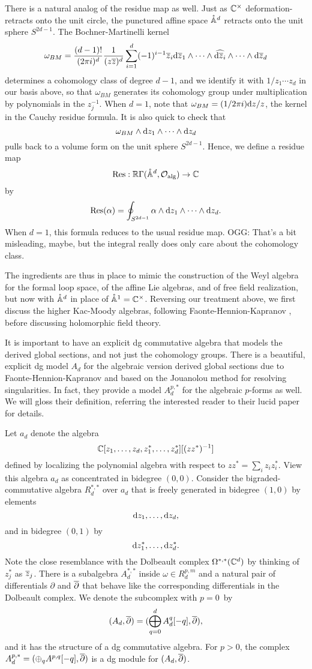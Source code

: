 \documentclass[11pt]{amsart}
\def\pAA{\mathring{\AA}}
\def\owen#1{{\textcolor{green!65!black}{OGG: {#1}}}}
\begin{document}
There is a natural analog of the residue map as well.
Just as $\mathbb C^\times$ deformation-retracts onto the unit circle,
the punctured affine space $\pAA^d$ retracts onto the unit sphere $S^{2d-1}$.
The Bochner-Martinelli kernel 
\[
\omega_{BM} = \frac{(d-1)!}{(2 \pi i)^d} \frac{1}{(z{\overline{z}})^d} \sum_{i=1}^d (-1)^{i-1} {\overline{z}}_i {\rm d} {\overline{z}}_1 \wedge \cdots \wedge \widehat{{\rm d} {\overline{z}}_i} \wedge \cdots \wedge {\rm d} {\overline{z}}_d
\]
determines a cohomology class of degree $d-1$, and we identify it with $1/z_1 \cdots z_d$ in our basis above,
so that $\omega_{BM}$ generates its cohomology group under multiplication by polynomials in the $z_j^{-1}$.
When $d = 1$, note that $\omega_{BM} = (1/2\pi i){\rm d} z/z$, the kernel in the Cauchy residue formula.
It is also quick to check that
\[
\omega_{BM} \wedge {\rm d} z_1 \wedge \cdots \wedge {\rm d} z_d
\]
pulls back to a volume form on the unit sphere $S^{2d-1}$.
Hence, we define a residue map
\[
\Res: \RR \Gamma(\pAA^d, \cO_{\rm alg})  \to \CC
\]
by
\[
{\rm Res}(\alpha) = \oint_{S^{2d-1}} \alpha \wedge {\rm d} z_1 \wedge \cdots \wedge {\rm d} z_d.
\]
When $d =1$, this formula reduces to the usual residue map.
\owen{That's a bit misleading, maybe, but the integral really does only care about the cohomology class.}

The ingredients are thus in place to mimic the construction of the Weyl algebra for the formal loop space, of the affine Lie algebras, and of free field realization, but now with $\pAA^d$ in place of $\pAA^1 = \CC^\times$.
Reversing our treatment above, we first discuss the higher Kac-Moody algebras, 
following Faonte-Hennion-Kapranov \cite{FHK},
before discussing holomorphic field theory.

It is important to have an explicit dg commutative algebra that models the derived global sections,
and not just the cohomology groups.
There is a beautiful, explicit dg model $A_d$ for the algebraic version derived global sections due to Faonte-Hennion-Kapranov \cite{FHK} and based on the Jouanolou method for resolving singularities. 
In fact, they provide a model $A^{p,*}_d$ for the algebraic $p$-forms as well.
We will gloss their definition, referring the interested reader to their lucid paper for details.

Let $a_d$ denote the algebra  
\[
\mathbb C[z_1,\ldots,z_d, z_1^*,\ldots,z_d^*][(z z^*)^{-1}]
\]
defined by localizing the polynomial algebra with respect to $zz^* = \sum_i z_i z^*_i$.
View this algebra $a_d$ as concentrated in bidegree $(0,0)$.
Consider the bigraded-commutative algebra $R^{*,*}_d$ over $a_d$ that is freely generated in bidegree $(1,0)$ by elements
\[
{\rm d} z_1,\ldots , {\rm d} z_d,
\] 
and in bidegree $(0,1)$ by
\[
{\rm d} z_1^*,\ldots, {\rm d} z_d^*.
\]
Note the close resemblance with the Dolbeault complex $\Omega^{*,*}(\mathbb C^d)$ by thinking of $z_j^*$ as ${\overline{z}}_j$.
There is a subalgebra $A^{*,*}_d$ inside $\omega \in R^{p,m}_d$ and a natural pair of differentials $\partial$ and ${\overline{\partial}}$ that behave like the corresponding differentials in the Dolbeault complex.
We denote the subcomplex with $p=0$~by 
\[
(A_d, {\overline{\partial}}) = (\bigoplus_{q = 0}^d A_d^{q}[-q], {\overline{\partial}}),
\] 
and it has the structure of a dg commutative algebra.
For $p>0$, the complex $A^{p,*}_d = (\oplus_q A^{p,q}[-q], {\overline{\partial}})$ is a dg module for $(A_d, {\overline{\partial}})$.
\end{document}
